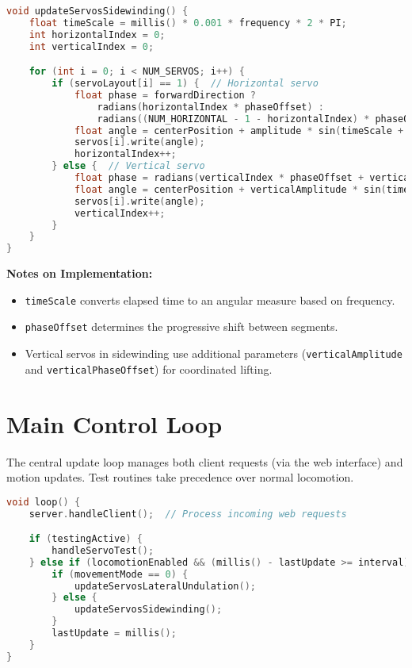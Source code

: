 \documentclass[12pt,a4paper]{report}
\begin{document}
\begin{lstlisting}[language=C++]
void updateServosSidewinding() {
    float timeScale = millis() * 0.001 * frequency * 2 * PI;
    int horizontalIndex = 0;
    int verticalIndex = 0;

    for (int i = 0; i < NUM_SERVOS; i++) {
        if (servoLayout[i] == 1) {  // Horizontal servo
            float phase = forwardDirection ? 
                radians(horizontalIndex * phaseOffset) : 
                radians((NUM_HORIZONTAL - 1 - horizontalIndex) * phaseOffset);
            float angle = centerPosition + amplitude * sin(timeScale + phase);
            servos[i].write(angle);
            horizontalIndex++;
        } else {  // Vertical servo
            float phase = radians(verticalIndex * phaseOffset + verticalPhaseOffset);
            float angle = centerPosition + verticalAmplitude * sin(timeScale + phase);
            servos[i].write(angle);
            verticalIndex++;
        }
    }
}
\end{lstlisting}

\textbf{Notes on Implementation:}
\begin{itemize}
    \item \texttt{timeScale} converts elapsed time to an angular measure based on frequency.
    \item \texttt{phaseOffset} determines the progressive shift between segments.
    \item Vertical servos in sidewinding use additional parameters (\texttt{verticalAmplitude} and \texttt{verticalPhaseOffset}) for coordinated lifting.
\end{itemize}

\section{Main Control Loop}
The central update loop manages both client requests (via the web interface) and motion updates. Test routines take precedence over normal locomotion.

\begin{lstlisting}[language=C++]
void loop() {
    server.handleClient();  // Process incoming web requests

    if (testingActive) {
        handleServoTest();
    } else if (locomotionEnabled && (millis() - lastUpdate >= interval)) {
        if (movementMode == 0) {
            updateServosLateralUndulation();
        } else {
            updateServosSidewinding();
        }
        lastUpdate = millis();
    }
}
\end{lstlisting}
\end{document}
